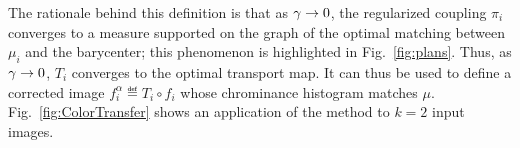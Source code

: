 The rationale behind this definition is that as $\gamma \rightarrow 0$, the regularized coupling $\pi_i$ converges to a measure supported on the graph of the optimal matching between $\mu_i$ and the barycenter; this phenomenon is highlighted in Fig.~\ref{fig:plans}. Thus, as $\gamma \rightarrow 0$, $T_i$ converges to the optimal transport map.  It can thus be used to define a corrected image $f_i^\alpha \eqdef T_i \circ f_i$ whose chrominance histogram matches $\mu$. Fig.~\ref{fig:ColorTransfer} shows an application of the method to $k=2$ input images.


	
\newcommand{\myfigColBary}[2]{\fbox{\texttt{[image: figures/colors/\#1/barycenter-unif-\#2]}}}
\newcommand{\myfigColImg}[3]{\texttt{[image: figures/colors/\#1/\#2-barycenter-unif-\#3]}}
%
\newcommand{\frameR}[1]{\setlength{\fboxrule}{3pt}%
	\fcolorbox{red}{white}{#1} }
\newcommand{\frameB}[1]{\setlength{\fboxrule}{3pt}%
	\fcolorbox{blue}{white}{#1} }
	
\newcommand{\myFigCol}[2]{ %
{%
\setlength{\fboxsep}{0pt}%
\begin{tabular}{@{}c@{\hspace{1mm}}c@{\hspace{1mm}}c@{\hspace{1mm}}c@{\hspace{1mm}}c@{\hspace{1mm}}c@{}}
	\myfigColImg{#1-#2}{#1}{1} &
	\myfigColImg{#1-#2}{#1}{3} &
	\myfigColImg{#1-#2}{#1}{5} &
	\myfigColImg{#1-#2}{#1}{7} &
	\frameR{\myfigColImg{#1-#2}{#1}{9}} \\
	\frameB{\myfigColImg{#1-#2}{#2}{1}} &
	\myfigColImg{#1-#2}{#2}{3} &
	\myfigColImg{#1-#2}{#2}{5} &
	\myfigColImg{#1-#2}{#2}{7} &
	\myfigColImg{#1-#2}{#2}{9} \\
	\myfigColBary{#1-#2}{1} &
	\myfigColBary{#1-#2}{3} &
	\myfigColBary{#1-#2}{5} &
	\myfigColBary{#1-#2}{7} &
	\myfigColBary{#1-#2}{9} \\
	$t=0$ & $t=1/4$ & $t=1/2$ & $t=3/4$ & $t=1$
\end{tabular}%
}%
}

